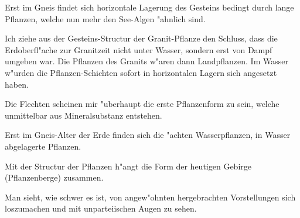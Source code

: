 \documentclass[a4paper, 11pt, oneside, german]{article}
\begin{document}
Erst im Gneis findet sich horizontale Lagerung des Gesteins bedingt durch lange Pflanzen, welche nun mehr den See-Algen "ahnlich sind.

Ich ziehe aus der Gesteins-Structur der Granit-Pflanze den Schluss, dass die Erdoberfl"ache zur Granitzeit nicht unter Wasser, sondern erst von Dampf umgeben war. Die Pflanzen des Granits w"aren dann Landpflanzen. Im Wasser w"urden die Pflanzen-Schichten sofort in horizontalen Lagern sich angesetzt haben.

Die Flechten scheinen mir "uberhaupt die erste Pflanzenform zu sein, welche unmittelbar aus Mineralsubstanz entstehen.

Erst im Gneis-Alter der Erde finden sich die "achten Wasserpflanzen, in Wasser abgelagerte Pflanzen.

Mit der Structur der Pflanzen h"angt die Form der heutigen Gebirge (Pflanzenberge) zusammen.

Man sieht, wie schwer es ist, von angew"ohnten hergebrachten Vorstellungen sich loszumachen und mit unparteiischen Augen zu sehen.
\clearpage
\pagestyle{fancy}
\fancyhf{}
\rhead{}
\cfoot{\thepage}

\pagestyle{plain}
\printindex
\clearpage
\end{document}
